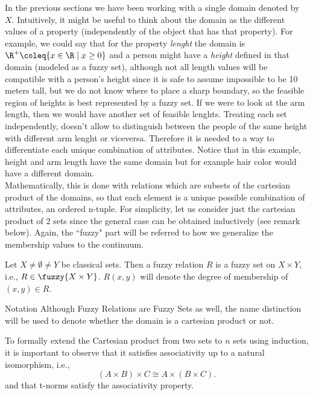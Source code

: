   In the previous sections we have been working with a single domain denoted by $X$. Intuitively, it might be useful to think about the domain as the different values of a property (independently of the object that has that property). For example, we could say that for the property \textit{lenght} the domain is $\R^+\coleq
  \{x\in\R \mid x \geq 0\}$ and a person might have a \textit{height} defined in that domain (modeled as a fuzzy set), although not all length values will be compatible with a person's height since it is safe to assume impossible to be 10 meters tall, but we do not know where to place a sharp boundary, so the feasible region of heights is best represented by a fuzzy set. If we were to look at the arm length, then we would have another set of feasible lenghts. Treating each set independently, doesn't allow to distinguish between the people of the same height with different arm lenght or viceversa. Therefore it is needed to a way to differentiate each unique combination of attributes. Notice that in this example, height and arm length have the same domain but for example hair color would have a different domain.\\

  Mathematically, this is done with relations which are subsets of the cartesian product of the domains, so that each element is a unique possible combination of attributes, an ordered n-tuple. For simplicity, let us consider just the cartesian product of 2 sets since the general case can be obtained inductively (see remark below). Again, the ``fuzzy" part will be referred to how we generalize the membership values to the continuum.


  \begin{definition}
    Let $X\neq \emptyset \neq Y$ be classical sets. Then a fuzzy relation $R$ is a fuzzy set on $X\times Y$, i.e., $R\in \fuzzy{X\times Y}$. $R(x,y)$ will denote the degree of membership of $(x,y) \in R$.
  \end{definition}

  \begin{notation}[label={not:compositionFS}]{Notation}
    Although Fuzzy Relations are Fuzzy Sets as well, the name distinction will be used to denote whether the domain is a cartesian product or not.
  \end{notation}

  \begin{remark}
    To formally extend the Cartesian product from two sets to \( n \) sets using induction, it is important to observe that it satisfies associativity up to a natural isomorphism, i.e., 
    \[
    (A\times B)\times C \cong A\times (B\times C).
    \]
    and that t-norms satisfy the associativity property.
  \end{remark}

